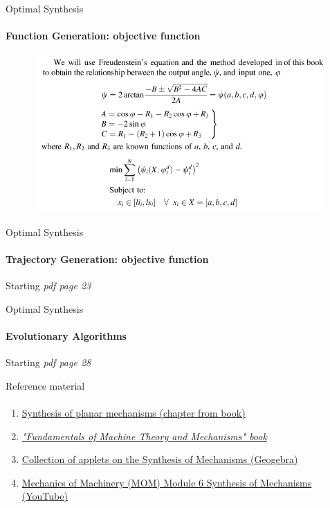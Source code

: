\documentclass[aspectratio=169]{beamer}
\newcommand{\fbckg}[1]{\usebackgroundtemplate{\texttt{[image: \#1]}}}%
\begin{document}
\begin{frame}[t]{Optimal Synthesis}
    \framesubtitle{Function Generation: objective function}
    \vspace{-0.7cm}
    \begin{figure}[H]
        \centering\includegraphics[height=6cm,width=1\textwidth,keepaspectratio]{opti_gen3.png}
        \label{fig:opti_gen3.png}
    \end{figure}
\end{frame}

\begin{frame}[t]{Optimal Synthesis}
    \framesubtitle{Trajectory Generation: objective function}
        \centering \LARGE
        Starting \textit{pdf page 23}
    \end{frame}

\begin{frame}[t]{Optimal Synthesis}
\framesubtitle{Evolutionary Algorithms}
    \centering \LARGE
    Starting \textit{pdf page 28}
\end{frame}

\begin{frame}[t]{Reference material}
    \framesubtitle{}
    \begin{enumerate}
        \item \href{https://disk.yandex.ru/i/GCbdbYRq94vbxA}{Synthesis of planar mechanisms (chapter from book)}
        \item \href{https://link.springer.com/book/10.1007/978-3-319-31970-4\#toc}{\textit{"Fundamentals of Machine Theory and Mechanisms" book}}
        \item \href{https://www.geogebra.org/m/SF2rQXEp}{Collection of applets on the Synthesis of Mechanisms (Geogebra)}
        \item \href{https://www.youtube.com/playlist?list=PLH1r3LGlktdvKBfxlcIji4Shf_RrWw8on}{Mechanics of Machinery (MOM) Module 6 Synthesis of Mechanisms (YouTube)}
    \end{enumerate}
\end{frame}



\fbckg{fibeamer/figs/last_page.png}
\frame[plain]{}
\end{document}
